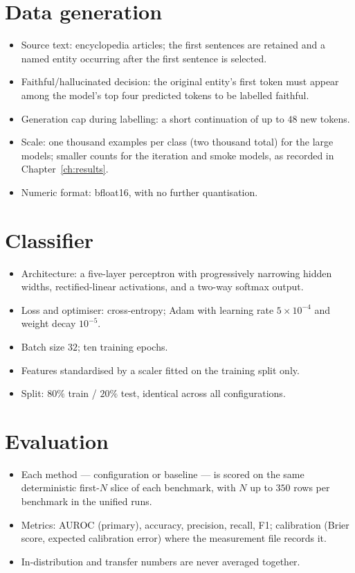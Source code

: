 \section*{Data generation}
\begin{itemize}[leftmargin=1.6em,itemsep=0.2em]
\item Source text: encyclopedia articles; the first sentences are retained and a named
entity occurring after the first sentence is selected.
\item Faithful/hallucinated decision: the original entity's first token must appear among
the model's top four predicted tokens to be labelled faithful.
\item Generation cap during labelling: a short continuation of up to $48$ new tokens.
\item Scale: one thousand examples per class (two thousand total) for the large models;
smaller counts for the iteration and smoke models, as recorded in Chapter~\ref{ch:results}.
\item Numeric format: bfloat16, with no further quantisation.
\end{itemize}

\section*{Classifier}
\begin{itemize}[leftmargin=1.6em,itemsep=0.2em]
\item Architecture: a five-layer perceptron with progressively narrowing hidden widths,
rectified-linear activations, and a two-way softmax output.
\item Loss and optimiser: cross-entropy; Adam with learning rate $5\times10^{-4}$ and weight
decay $10^{-5}$.
\item Batch size $32$; ten training epochs.
\item Features standardised by a scaler fitted on the training split only.
\item Split: $80\%$ train / $20\%$ test, identical across all configurations.
\end{itemize}

\section*{Evaluation}
\begin{itemize}[leftmargin=1.6em,itemsep=0.2em]
\item Each method --- configuration or baseline --- is scored on the same deterministic
first-$N$ slice of each benchmark, with $N$ up to $350$ rows per benchmark in the unified
runs.
\item Metrics: AUROC (primary), accuracy, precision, recall, F1; calibration (Brier score,
expected calibration error) where the measurement file records it.
\item In-distribution and transfer numbers are never averaged together.
\end{itemize}

